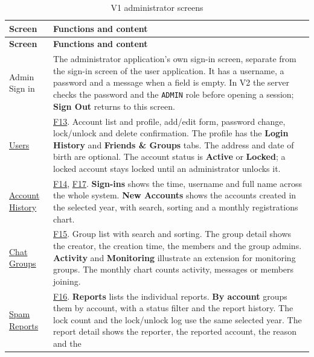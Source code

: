 \begingroup
\small
\begin{longtable}{|L{4.3cm}|L{\dimexpr\textwidth-4.3cm-4\arrayrulewidth\relax}|}
  \caption{V1 administrator screens}
  \label{tab:admin-screen-map}\\
  \hline
  \textbf{Screen} & \textbf{Functions and content}\\
  \hline
  \endfirsthead
  \hline
  \textbf{Screen} & \textbf{Functions and content}\\
  \hline
  \endhead
  Admin Sign in
  & The administrator application's own sign-in screen, separate from the sign-in
  screen of the user application. It has a username, a password and a message when
  a field is empty. In V2 the server checks the password and the \texttt{ADMIN} role
  before opening a session; \textbf{Sign Out} returns to this screen.\\
  \hline
  \href{https://www.figma.com/design/maCogjZs9eOOhfkxsOZoIU?node-id=2-80}{Users}
  & \hyperlink{F13}{F13}. Account list and profile, add/edit form,
  password change, lock/unlock and delete confirmation. The profile has the
  \textbf{Login History} and \textbf{Friends \& Groups} tabs. The address and date of
  birth are optional. The account status is \textbf{Active} or \textbf{Locked};
  a locked account stays locked until an administrator unlocks it.\\
  \hline
  \href{https://www.figma.com/design/maCogjZs9eOOhfkxsOZoIU?node-id=16-822}{Account History}
  & \hyperlink{F14}{F14}, \hyperlink{F17}{F17}. \textbf{Sign-ins} shows the time,
  username and full name across the whole system. \textbf{New Accounts}
  shows the accounts created in the selected year, with search, sorting and a monthly
  registrations chart.\\
  \hline
  \href{https://www.figma.com/design/maCogjZs9eOOhfkxsOZoIU?node-id=25-1020}{Chat Groups}
  & \hyperlink{F15}{F15}. Group list with search and sorting. The group detail
  shows the creator, the creation time, the members and the group admins.
  \textbf{Activity} and \textbf{Monitoring} illustrate an extension for monitoring
  groups. The monthly chart counts activity, messages or members joining.\\
  \hline
  \href{https://www.figma.com/design/maCogjZs9eOOhfkxsOZoIU?node-id=38-1461}{Spam Reports}
  & \hyperlink{F16}{F16}. \textbf{Reports} lists the individual reports.
  \textbf{By account} groups them by account, with a status filter and the report
  history. The lock count and the lock/unlock log use the same selected year.
  The report detail shows the reporter, the reported account, the reason and the

\end{longtable}
